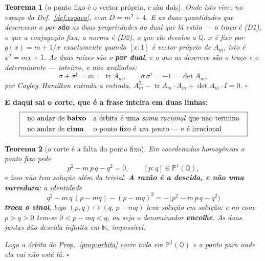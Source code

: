 \documentclass[11pt,a4paper]{article}
\newtheorem{teorema}{Teorema}
\newcommand{\dg}{^{\dagger}}
\begin{document}
\begin{teorema}[o ponto fixo é o vector próprio, e são dois]\label{thm:fixo-dual}
\emph{Onde isto vive:} no espaço da Def.~\ref{def:espaco}, com $D=m^{2}+4$. E as duas
quantidades que descrevem o par \textbf{são} as duas propriedades do dual que lá estão ---
o traço é (D1), o que a conjugação fixa; a norma é (D2), o que ela devolve a $\mathbb{Q}$.
$x$ é fixo por $g(x)=m+1/x$ exactamente quando $[x:1]$ é vector próprio de $A_m$,
isto é $x^{2}=mx+1$. As duas raízes são o \textbf{par dual}, e o que as descreve são
o traço e o determinante --- \emph{inteiros}, e não avaliados:
\[
\sigma+\sigma\dg=m=\operatorname{tr}A_m,
\qquad
\sigma\,\sigma\dg=-1=\det A_m ,
\]
por Cayley--Hamilton entrada a entrada, $A_m^{2}-\operatorname{tr}A_m\cdot A_m+\det
A_m\cdot I=0$. $\square$
\end{teorema}

\medskip
\noindent\textbf{E daqui sai o corte, que é a frase inteira em duas linhas:}
\[
\boxed{\;\begin{array}{ll}
\text{no andar de \textbf{baixo}} & \text{a órbita é uma \emph{soma racional} que não
termina}\\[3pt]
\text{no andar de \textbf{cima}} & \text{o ponto fixo é \emph{um} ponto --- e é
irracional}
\end{array}\;}
\]

\begin{teorema}[o corte é a falta do ponto fixo]\label{thm:corte-fixo}
Em coordenadas homogéneas o ponto fixo pede
\[
p^{2}-m\,p\,q-q^{2}=0,\qquad [p:q]\in\mathbb{P}^1(\mathbb{Q}),
\]
e isso não tem solução além da trivial. \textbf{A razão é a descida, e não uma
varredura}: a identidade
\[
\boxed{\;q^{2}-m\,q\,(p-mq)-(p-mq)^{2}=-\bigl(p^{2}-m\,p\,q-q^{2}\bigr)\;}
\]
\textbf{troca o sinal}, logo $(p,q)\mapsto(q,\,p-mq)$ leva solução em solução; e no
cone $p>q>0$ tem-se $0<p-mq<q$, ou seja o denominador \textbf{encolhe}. As duas
juntas dão descida infinita em $\mathbb{N}$, impossível.

\emph{Logo a órbita da Prop.~\ref{prop:orbita} corre toda em $\mathbb{P}^1(\mathbb{Q})$
e o ponto para onde ela vai não está lá.} $\square$
\end{teorema}
\end{document}
